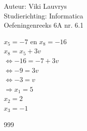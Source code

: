 \documentclass[a4paper]{article}
\begin{document}
  
\noindent \large Auteur: Viki	Lauvrys \\
\noindent \large Studierichting: Informatica\\
\noindent \large Oefeningenreeks 6A nr. 6.1\\

\medskip

\normalsize

$ x_5 = -7 $ en $ x_8 = -16 $ \\

$ x_8 = x_5 + 3v $ \\

$ \Leftrightarrow -16 = -7 + 3v $ \\

$ \Leftrightarrow -9 = 3v $ \\

$ \Leftrightarrow -3 = v $ \\

$ \Rightarrow x_1 = 5 $ \\

$ x_2 = 2 $ \\

$ x_3 = -1 $ \\

\begin{thebibliography}{999}
\end{thebibliography}
\end{document}
